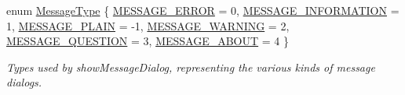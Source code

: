 \begin{DoxyCompactItemize}
enum \mbox{\hyperlink{classGOptionPane_ac6606ebe91c8ac66a2c314c79f5ab013}{Message\+Type}} \{ \mbox{\hyperlink{classGOptionPane_ac6606ebe91c8ac66a2c314c79f5ab013aeed68e2821e40e5751af74e449ba1fa7}{M\+E\+S\+S\+A\+G\+E\+\_\+\+E\+R\+R\+OR}} = 0, 
\mbox{\hyperlink{classGOptionPane_ac6606ebe91c8ac66a2c314c79f5ab013a7c67175dfb6af3e42428b6fcfcbe7d94}{M\+E\+S\+S\+A\+G\+E\+\_\+\+I\+N\+F\+O\+R\+M\+A\+T\+I\+ON}} = 1, 
\mbox{\hyperlink{classGOptionPane_ac6606ebe91c8ac66a2c314c79f5ab013ac03a17c74c589b004d166532958a6196}{M\+E\+S\+S\+A\+G\+E\+\_\+\+P\+L\+A\+IN}} = -\/1, 
\mbox{\hyperlink{classGOptionPane_ac6606ebe91c8ac66a2c314c79f5ab013aa0da5a01a18f78c0f248941ad32cc816}{M\+E\+S\+S\+A\+G\+E\+\_\+\+W\+A\+R\+N\+I\+NG}} = 2, 
\mbox{\hyperlink{classGOptionPane_ac6606ebe91c8ac66a2c314c79f5ab013a5331d292e92d35f202913bb0b3dfa587}{M\+E\+S\+S\+A\+G\+E\+\_\+\+Q\+U\+E\+S\+T\+I\+ON}} = 3, 
\mbox{\hyperlink{classGOptionPane_ac6606ebe91c8ac66a2c314c79f5ab013acea265b81d984cd186ef5f7fe627caa5}{M\+E\+S\+S\+A\+G\+E\+\_\+\+A\+B\+O\+UT}} = 4
 \}
\begin{DoxyCompactList}\small\item\em Types used by show\+Message\+Dialog, representing the various kinds of message dialogs. \end{DoxyCompactList}\end{DoxyCompactItemize}
